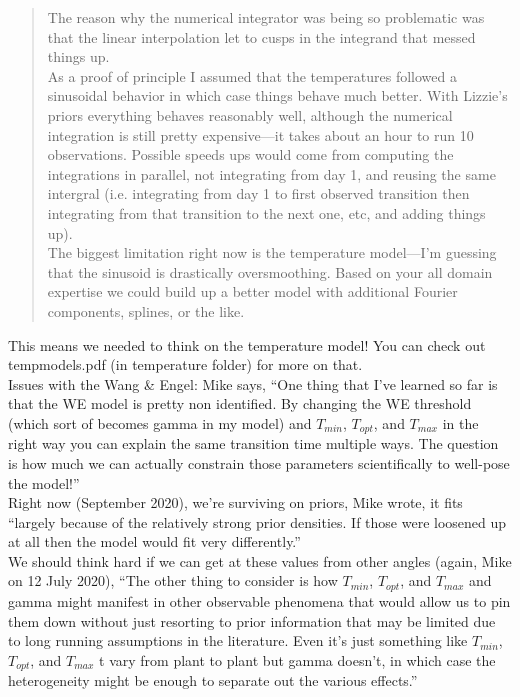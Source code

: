 \documentclass[11pt,letter]{article}
\begin{document}
\begin{quote}
The reason why the numerical integrator was being so problematic 
was that the linear interpolation let to cusps in the integrand that 
messed things up. \\

As a proof of principle I assumed that the temperatures followed a
sinusoidal behavior in which case things behave much better.  With 
Lizzie's priors everything behaves reasonably well, although the 
numerical integration is still pretty expensive---it takes about an 
hour to run 10 observations.  Possible speeds ups would come 
from computing the integrations in parallel, not integrating from 
day 1, and reusing the same intergral (i.e. integrating from day 1
to first observed transition then integrating from that transition to 
the next one, etc, and adding things up).\\

The biggest limitation right now is the temperature model---I'm 
guessing that the sinusoid is drastically oversmoothing.  Based 
on your all domain expertise we could build up a better model 
with additional Fourier components, splines, or the like.
\end{quote}

This means we needed to think on the temperature model! You can check out tempmodels.pdf (in temperature folder) for more on that.\\


Issues with the Wang \& Engel:
Mike says, ``One thing that I’ve learned so far is that the WE model is pretty non identified. By changing the WE threshold (which sort of becomes gamma in my model) and $T_{min}$, $T_{opt}$, and $T_{max}$ in the right way you can explain the same transition time multiple ways.  The question is how much we can actually constrain those parameters scientifically to well-pose the model!''\\

Right now (September 2020), we're surviving on priors, Mike wrote, it fits ``largely because of the relatively strong prior densities.  If those 
were loosened up at all then the model would fit very differently.''\\

We should think hard if we can get at these values from other angles (again, Mike on 12 July 2020), ``The other thing to consider is how $T_{min}$, $T_{opt}$, and $T_{max}$  and gamma might  manifest in other observable phenomena that would allow us to pin them  down without just resorting to prior information that may be limited due to  long running assumptions in the literature.  Even it’s just something like  $T_{min}$, $T_{opt}$, and $T_{max}$ t vary from plant to plant but gamma doesn’t, in  which case the heterogeneity might be enough to separate out the various effects.''
\end{document}
